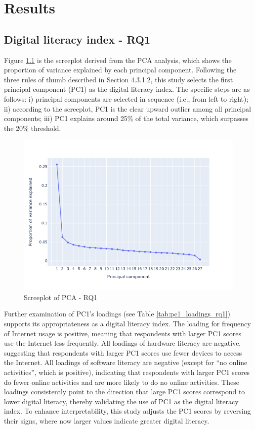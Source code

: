 \chapter{\label{ch:5-result}Results}

\section{Digital literacy index - RQ1}
Figure \ref{fig:screeplot_rq1} is the screeplot derived from the PCA analysis, which shows the proportion of variance explained by each principal component. Following the three rules of thumb \parencite[p. 212]{zelterman_applied_2015} described in Section 4.3.1.2, this study selects the first principal component (PC1) as the digital literacy index. The specific steps are as follows: i) principal components are selected in sequence (i.e., from left to right); ii) according to the screeplot, PC1 is the clear upward outlier among all principal components; iii) PC1 explains around 25\% of the total variance, which surpasses the 20\% threshold. 

\begin{figure}
    \centering
    \caption{Screeplot of PCA - RQ1}
    \label{fig:screeplot_rq1}
    \includegraphics[width=\textwidth]{figures/pca_screeplot_q1.png}
\end{figure}

Further examination of PC1's loadings (see Table \ref{tab:pc1_loadings_rq1}) supports its appropriateness as a digital literacy index. The loading for frequency of Internet usage is positive, meaning that respondents with larger PC1 scores use the Internet less frequently. All loadings of hardware literacy are negative, suggesting that respondents with larger PC1 scores use fewer devices to access the Internet. All loadings of software literacy are negative (except for ``no online activities”, which is positive), indicating that respondents with larger PC1 scores do fewer online activities and are more likely to do no online activities. These loadings consistently point to the direction that large PC1 scores correspond to lower digital literacy, thereby validating the use of PC1 as the digital literacy index. To enhance interpretability, this study adjusts the PC1 scores by reversing their signs, where now larger values indicate greater digital literacy.

